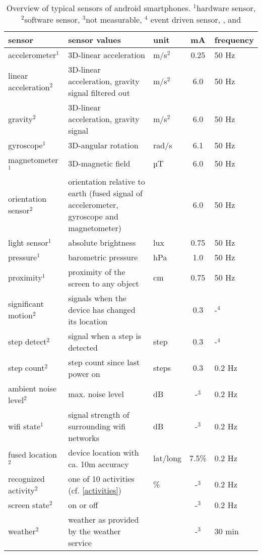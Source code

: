 \documentclass[a4paper]{report}
\begin{document}
\begin{table}[]
  \begin{adjustwidth}{-3cm}{-3cm}  
    \begin{tabularx}{1.5\textwidth}{lXlcl}
      
      sensor & sensor values & unit & mA & frequency\\ \midrule
      accelerometer$^1$ & 3D-linear acceleration & m/s$^2$& 0.25 & 50 Hz \\
      linear acceleration$^2$ & 3D-linear acceleration, gravity signal filtered out& m/s$^2$ & 6.0& 50 Hz \\
      gravity$^2$ & 3D-linear acceleration, gravity signal & m/s$^2$& 6.0& 50 Hz \\
      gyroscope$^1$ & 3D-angular rotation & rad/s & 6.1 & 50 Hz\\
      magnetometer$^1$ & 3D-magnetic field & µT & 6.0& 50 Hz \\
      orientation sensor$^2$ & orientation relative to earth (fused signal of accelerometer, gyroscope and magnetometer) &  & 6.0& 50 Hz\\
      light sensor$^1$ & absolute brightness & lux & 0.75 & 50 Hz\\
      pressure$^1$ & barometric pressure & hPa & 1.0& 50 Hz\\
      proximity$^1$ & proximity of the screen to any object & cm & 0.75& 50 Hz\\
      significant motion$^2$ & signals when the device has changed its location & & 0.3 & -$^4$\\
      step detect$^2$ & signal when a step is detected & step & 0.3 & -$^4$\\
      step count$^2$ & step count since last power on & steps & 0.3& 0.2 Hz \\
      ambient noise level$^2$ & max. noise level & dB & -$^3$ & 0.2 Hz \\
      wifi state$^1$ & signal strength of surrounding wifi networks & dB & -$^3$ & 0.2 Hz\\
      fused location$^2$ & device location with ca. 10m accuracy & lat/long & 7.5\%& 0.2 Hz\\
      recognized activity$^2$ & one of 10 activities (cf. \ref{activities}) & \%&-$^3$& 0.2 Hz\\
      screen state$^2$ & on or off &  &-$^3$& 0.2 Hz\\
      weather$^2$ & weather as provided by the weather service &  &  -$^3$ & 30 min\\
    \end{tabularx}
    \caption{\label{sensorpower}Overview of typical sensors of android smartphones. $^1$hardware sensor, $^2$software sensor, $^3$not measurable, $^4$ event driven sensor, ,  and  }
  \end{adjustwidth}
\end{table}
\end{document}
